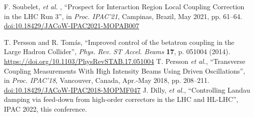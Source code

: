 \documentclass{cernatsnote}
\begin{document}
\begin{thebibliography}{99}
   F. Soubelet,  {\it et al.} ,
   \textquotedblleft{Prospect for Interaction Region Local Coupling Correction in the LHC Run 3}\textquotedblright,
   in \emph{Proc. IPAC’21}, Campinas, Brazil, May 2021, pp. 61--64.
   \url{doi:10.18429/JACoW-IPAC2021-MOPAB007}  

 T. Persson and R. Tom\'as, ``Improved control of the betatron coupling in the Large Hadron Collider'',
{\it Phys. Rev. ST Accel. Beams} {\bf 17}, p. 051004 (2014).
\url{https://doi.org/10.1103/PhysRevSTAB.17.051004}
%
    T. Persson \emph{et al.},
   \textquotedblleft{Transverse Coupling Measurements With High Intensity Beams Using Driven Oscillations}\textquotedblright,
   in \emph{Proc. IPAC’18}, Vancouver, Canada, Apr.-May 2018, pp. 208--211.
   \url{doi:10.18429/JACoW-IPAC2018-MOPMF047}    
%
 J. Dilly, {\it et al.}, ``Controlling Landau damping via feed-down from high-order correctors in the LHC and HL-LHC'', IPAC 2022, this conference.

%


%





\end{thebibliography}
\end{document}

